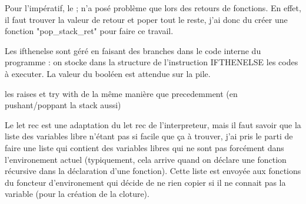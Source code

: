 \documentclass[a4paper,10pt]{report}
\begin{document}
Pour l'impératif, le ; n'a posé problème que lors des retours de fonctions. En effet, il faut trouver la valeur de retour et poper tout le reste, j'ai donc du créer une fonction "pop\_stack\_ret" pour faire ce travail.

Les ifthenelse sont géré en faisant des branches dans le code interne du programme : on stocke dans la structure de l'instruction IFTHENELSE les codes à executer. La valeur du booléen est attendue sur la pile.

les raises et try with de la même manière que precedemment (en pushant/poppant la stack aussi)

Le let rec est une adaptation du let rec de l'interpreteur, mais il faut savoir que la liste des variables libre n'étant pas si facile que ça à trouver, j'ai pris le parti de faire une liste qui contient des variables libres qui ne sont pas forcément dans l'environement actuel (typiquement, cela arrive quand on déclare une fonction récursive dans la déclaration d'une fonction). Cette liste est envoyée aux fonctions du foncteur d'environement qui décide de ne rien copier si il ne connait pas la variable (pour la création de la cloture).
\end{document}
